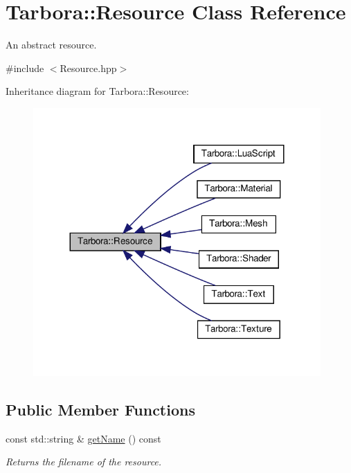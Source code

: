 \hypertarget{classTarbora_1_1Resource}{}\section{Tarbora\+:\+:Resource Class Reference}
\label{classTarbora_1_1Resource}


An abstract resource.  




{\ttfamily \#include $<$Resource.\+hpp$>$}



Inheritance diagram for Tarbora\+:\+:Resource\+:\nopagebreak
\begin{figure}[H]
\begin{center}
\leavevmode
\includegraphics[width=311pt]{classTarbora_1_1Resource__inherit__graph}
\end{center}
\end{figure}
\subsection*{Public Member Functions}
\begin{DoxyCompactItemize}
\item 
\mbox{\label{classTarbora_1_1Resource_afc89548edc7c22bfe6c2270dd011d189}} 
const std\+::string \& \hyperlink{classTarbora_1_1Resource_afc89548edc7c22bfe6c2270dd011d189}{get\+Name} () const
\begin{DoxyCompactList}\small\item\em Returns the filename of the resource. \end{DoxyCompactList}\end{DoxyCompactItemize}
